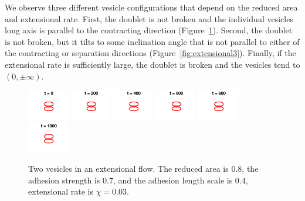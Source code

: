 \documentclass[%
preprint,
 amsmath,amssymb,
 aps,
]{revtex4-1}
\begin{document}
We observe three different vesicle configurations that depend on the
reduced area and extensional rate.  First, the doublet is not broken and
the individual vesicles long axis is parallel to the contracting
direction (Figure~\ref{fig:extensional1}).  Second, the doublet is not
broken, but it tilts to some inclination angle that is not parallel to
either of the contracting or separation directions
(Figure~\ref{fig:extensional3}).  Finally, if the extensional rate is
sufficiently large, the doublet is broken and the vesicles tend to
$(0,\pm \infty)$.


\begin{figure}[htp]
  \includegraphics[width = 0.16\textwidth]{figs/extensional_adR4em1adS7em1Chi3em2_ra080_image01.png}
  \includegraphics[width = 0.16\textwidth]{figs/extensional_adR4em1adS7em1Chi3em2_ra080_image02.png}
  \includegraphics[width = 0.16\textwidth]{figs/extensional_adR4em1adS7em1Chi3em2_ra080_image03.png}
  \includegraphics[width = 0.16\textwidth]{figs/extensional_adR4em1adS7em1Chi3em2_ra080_image04.png}
  \includegraphics[width = 0.16\textwidth]{figs/extensional_adR4em1adS7em1Chi3em2_ra080_image05.png}
  \includegraphics[width = 0.16\textwidth]{figs/extensional_adR4em1adS7em1Chi3em2_ra080_image06.png}
  \caption{\label{fig:extensional1} Two vesicles in an extensional flow.
  The reduced area is $0.8$, the adhesion strength is $0.7$, and the
  adhesion length scale is $0.4$, extensional rate is $\chi = 0.03$.}
\end{figure}
\end{document}
